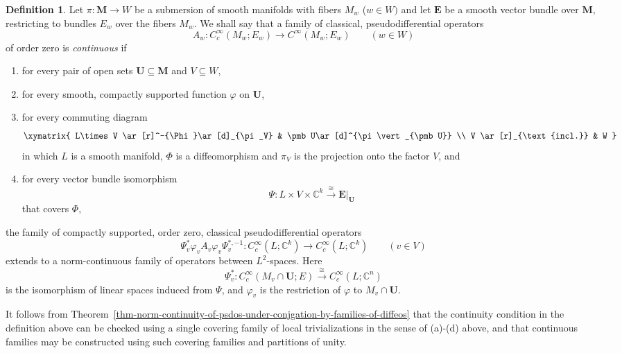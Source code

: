 \documentclass[leqno,11pt]{amsart}
\numberwithin{equation}{subsection}
\theoremstyle{plain}
\theoremstyle{definition}
\newtheorem{definition}[equation]{Definition}
\theoremstyle{remark}
\newcommand{\C}{\mathbb{C}}
\begin{document}
\begin{definition} 
\label{def-continuous-family}
Let $\pi\colon  \pmb M \to W$ be a submersion of smooth manifolds with fibers $M_w$ ($w\in W)$ and let $\pmb E $ be a smooth vector bundle over $\pmb M$, restricting to bundles $E_w$ over the fibers $M_w$.  We shall say that a family of classical, pseudodifferential operators 
\[
A_w \colon C_c^\infty  (M_w;E_w) \longrightarrow C^\infty (M_w; E_w)\qquad (w\in W) 
\]
of order zero is \emph{continuous} if  
\begin{enumerate}[\rm (a)]

\item for every pair of open sets  $\pmb U\subseteq \pmb M$ and $V\subseteq W$, 

\item for every smooth, compactly supported function $\varphi $ on $\pmb{U}$,

\item for every commuting diagram
\[
\xymatrix{
L\times V \ar[r]^-{\Phi}\ar[d]_{\pi_V} & \pmb U\ar[d]^{\pi\vert_{\pmb U}}
\\
V \ar[r]_{\text{incl.}} & W
}
\]
in which $L$ is a smooth manifold, $\Phi$ is a diffeomorphism and $\pi_V$ is the projection onto the factor $V$, and    

\item for every vector bundle isomorphism
\[
\Psi \colon  L{\times} V {\times} \C^k \stackrel \cong \longrightarrow \pmb  E \vert _{\pmb U} 
\]
that covers $\Phi$, 
\end{enumerate}
the family of compactly supported, order zero, classical pseudodifferential  operators 
\[
\Psi^*_v  \varphi_v A_v \varphi_v \Psi_v^{*,-1} \colon C_c^\infty (L;\C^k ) \longrightarrow  C_c^\infty (L;\C^k )\qquad (v\in V)
\]
extends to a norm-continuous family of operators between $L^2$-spaces. Here 
\[
\Psi_v^*\colon C_c^\infty ( M_v\cap \pmb U; E) \stackrel \cong \longrightarrow 
C_c^\infty (L; \C^n)
\]
is the isomorphism of linear spaces induced from $\Psi$, and $\varphi_v$ is the restriction of $\varphi$ to $M_v\cap \pmb U$.
\end{definition} 

It follows from Theorem~\ref{thm-norm-continuity-of-psdos-under-conjgation-by-families-of-diffeos} that the continuity condition in the definition above  can be checked using a single covering family of local trivializations in the sense of (a)-(d) above, and that continuous families may be constructed using such covering families and partitions of unity. 
\end{document}

